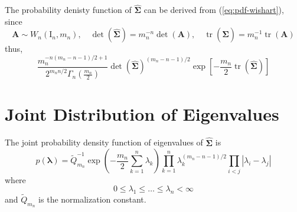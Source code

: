 The probability denisty function of $\widehat{\boldsymbol{\Sigma}}$ can be derived from (\ref{eq:pdf-wishart}), since
\begin{equation*}
    \mathbf{A}\sim W_{n}\left(\mathrm{I}_{n},m_{n}\right),\quad\operatorname{det}\left(\widehat{\boldsymbol{\Sigma}}\right)=m_{n}^{-n}\operatorname{det}\left(\mathbf{A}\right),\quad\operatorname{tr}\left(\widehat{\boldsymbol{\Sigma}}\right)=m_{n}^{-1}\operatorname{tr}\left(\mathbf{A}\right)
\end{equation*}
thus,
\begin{equation}
    \frac{m_{n}^{-n(m_{n}-n-1)/2+1}}{2^{m_{n}n/2}\Gamma_{n}\left(\frac{m_{n}}{2}\right)}\operatorname{det}\left(\widehat{\boldsymbol{\Sigma}}\right)^{(m_{n}-n-1)/2}\exp\left[-\frac{m_{n}}{2}\operatorname{tr}\left(\widehat{\boldsymbol{\Sigma}}\right)\right]
\end{equation}

\section{Joint Distribution of Eigenvalues}

\begin{theorem}
    The joint probability density function of eigenvalues of $\widehat{\boldsymbol{\Sigma}}$ is
    \begin{equation}
        p\left(\boldsymbol{\lambda}\right)=\widetilde{Q}_{m_{n}}^{-1}\exp\left(-\frac{m_{n}}{2}\sum_{k=1}^{n}\lambda_{k}\right)\prod_{k=1}^{n}\lambda_{k}^{(m_{n}-n-1)/2}\prod_{i<j}\left|\lambda_{i}-\lambda_{j}\right|
        \label{eq:jpdf-eigenvalues-sigma}
    \end{equation}
    where
    \begin{equation*}
        0\leq\lambda_{1}\leq\ldots\leq\lambda_{n}<\infty
    \end{equation*}
    and $\widetilde{Q}_{m_{n}}$ is the normalization constant.
\end{theorem}

